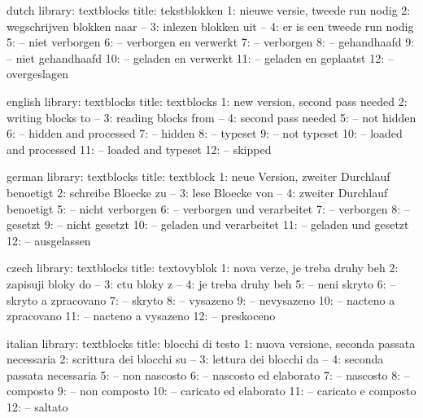 


\startmessages  dutch  library: textblocks
  title: tekstblokken
      1: nieuwe versie, tweede run nodig
      2: wegschrijven blokken naar --
      3: inlezen blokken uit --
      4: er is een tweede run nodig
      5: -- niet verborgen
      6: -- verborgen en verwerkt
      7: -- verborgen
      8: -- gehandhaafd
      9: -- niet gehandhaafd
     10: -- geladen en verwerkt
     11: -- geladen en geplaatst
     12: -- overgeslagen
\stopmessages

\startmessages  english  library: textblocks
  title: textblocks
      1: new version, second pass needed
      2: writing blocks to --
      3: reading blocks from --
      4: second pass needed
      5: -- not hidden
      6: -- hidden and processed
      7: -- hidden
      8: -- typeset
      9: -- not typeset
     10: -- loaded and processed
     11: -- loaded and typeset
     12: -- skipped
\stopmessages

\startmessages  german  library: textblocks
  title: textblock
      1: neue Version, zweiter Durchlauf benoetigt
      2: schreibe Bloecke zu --
      3: lese Bloecke von --
      4: zweiter Durchlauf benoetigt
      5: -- nicht verborgen
      6: -- verborgen und verarbeitet
      7: -- verborgen
      8: -- gesetzt
      9: -- nicht gesetzt
     10: -- geladen und verarbeitet
     11: -- geladen und gesetzt
     12: -- ausgelassen
\stopmessages

\startmessages  czech  library: textblocks
  title: textovyblok
      1: nova verze, je treba druhy beh
      2: zapisuji bloky do --
      3: ctu bloky z --
      4: je treba druhy beh
      5: -- neni skryto
      6: -- skryto a zpracovano
      7: -- skryto
      8: -- vysazeno
      9: -- nevysazeno
     10: -- nacteno a zpracovano
     11: -- nacteno a vysazeno
     12: -- preskoceno
\stopmessages

\startmessages  italian  library: textblocks
  title: blocchi di testo
      1: nuova versione, seconda passata necessaria
      2: scrittura dei blocchi su --
      3: lettura dei blocchi da --
      4: seconda passata necessaria
      5: -- non nascosto
      6: -- nascosto ed elaborato
      7: -- nascosto
      8: -- composto
      9: -- non composto
     10: -- caricato ed elaborato
     11: -- caricato e composto
     12: -- saltato
\stopmessages

